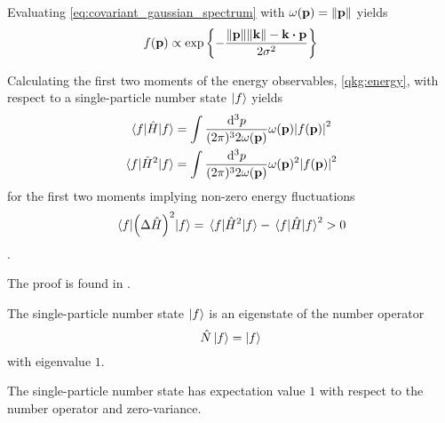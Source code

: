 \begin{example}
	Evaluating \cref{eq:covariant_gaussian_spectrum} with $\omega(\vb{p})=\norm{\vb{p}}$ yields
	\begin{equation}
		f(\vb{p})
		\propto
		\exp\left\{
			-
			\frac{\norm{\vb{p}}\norm{\vb{k}}-\vb{k}\vdot\vb{p}}{2\sigma^2}
		\right\}
	\end{equation}
\end{example}
\begin{theorem}\label{thm:single_particle_number_state_energy}
	Calculating the first two moments of the energy observables, \cref{qkg:energy}, with respect to a single-particle number state $\ket{f}$ yields
	\begin{align}
		\expval{\hat{H}}{f}
		&=
		\int\frac{\dd[3]{p}}{(2\pi)^32\omega(\vb{p})}
		\omega(\vb{p})
		\abs{f(\vb{p})}^2
		\\
		\expval{\hat{H}^2}{f}
		&=
		\int\frac{\dd[3]{p}}{(2\pi)^32\omega(\vb{p})}
		\omega(\vb{p})^2
		\abs{f(\vb{p})}^2
		\label{eq:single_particle_number_state_energy}
	\end{align}
	for the first two moments implying non-zero energy fluctuations
	\begin{equation}
		\expval{\left(\Delta\hat{H}\right)^2}{f}
		=
		\expval{\hat{H}^2}{f}
		-
		\expval{\hat{H}}{f}^2
		>
		0
	\end{equation}.
\end{theorem}
The proof is found in .
\begin{theorem}\label{thm:single_particle_number_state_number_eigenstate}
	The single-particle number state $\ket{f}$ is an eigenstate of the number operator
	\begin{equation}
		\hat{N}
		\ket{f}
		=
		\ket{f}
	\end{equation}
	with eigenvalue $1$.
\end{theorem}
\begin{corollary}
	The single-particle number state has expectation value $1$ with respect to the number operator and zero-variance.
\end{corollary}

